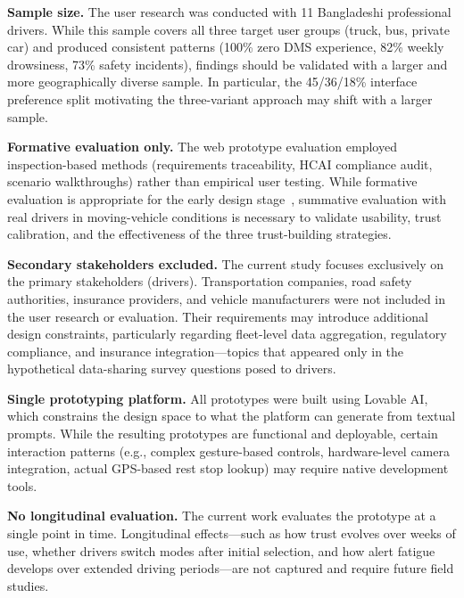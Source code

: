 \documentclass[sigconf]{acmart}
\begin{document}
\textbf{Sample size.} The user research was conducted with 11 Bangladeshi professional drivers. While this sample covers all three target user groups (truck, bus, private car) and produced consistent patterns (100\% zero DMS experience, 82\% weekly drowsiness, 73\% safety incidents), findings should be validated with a larger and more geographically diverse sample. In particular, the 45/36/18\% interface preference split motivating the three-variant approach may shift with a larger sample.

\textbf{Formative evaluation only.} The web prototype evaluation employed inspection-based methods (requirements traceability, HCAI compliance audit, scenario walkthroughs) rather than empirical user testing. While formative evaluation is appropriate for the early design stage~\cite{ref12, ref13}, summative evaluation with real drivers in moving-vehicle conditions is necessary to validate usability, trust calibration, and the effectiveness of the three trust-building strategies.

\textbf{Secondary stakeholders excluded.} The current study focuses exclusively on the primary stakeholders (drivers). Transportation companies, road safety authorities, insurance providers, and vehicle manufacturers were not included in the user research or evaluation. Their requirements may introduce additional design constraints, particularly regarding fleet-level data aggregation, regulatory compliance, and insurance integration---topics that appeared only in the hypothetical data-sharing survey questions posed to drivers.

\textbf{Single prototyping platform.} All prototypes were built using Lovable AI, which constrains the design space to what the platform can generate from textual prompts. While the resulting prototypes are functional and deployable, certain interaction patterns (e.g., complex gesture-based controls, hardware-level camera integration, actual GPS-based rest stop lookup) may require native development tools.

\textbf{No longitudinal evaluation.} The current work evaluates the prototype at a single point in time. Longitudinal effects---such as how trust evolves over weeks of use, whether drivers switch modes after initial selection, and how alert fatigue develops over extended driving periods---are not captured and require future field studies.


\end{document}

